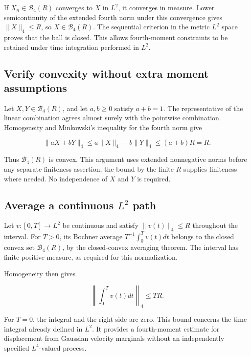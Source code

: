 \documentclass[11pt,a4paper]{report}
\begin{document}
If \(X_n\in\mathcal B_4(R)\) converges to \(X\) in \(L^2\), it converges in measure. Lower semicontinuity of the extended fourth norm under this convergence gives \(\|X\|_4\le R\), so \(X\in\mathcal B_4(R)\). The sequential criterion in the metric \(L^2\) space proves that the ball is closed. This allows fourth-moment constraints to be retained under time integration performed in \(L^2\).

\subsection{\texorpdfstring{Verify convexity without extra moment assumptions}{Verify convexity without extra moment assumptions}}
\label{report-step-KineticLangevin-LpMomentIntegral-lean-2}


Let \(X,Y\in\mathcal B_4(R)\), and let \(a,b\ge0\) satisfy \(a+b=1\). The representative of the linear combination agrees almost surely with the pointwise combination. Homogeneity and Minkowski's inequality for the fourth norm give

\[\|aX+bY\|_4\le a\|X\|_4+b\|Y\|_4\le(a+b)R=R.\]

Thus \(\mathcal B_4(R)\) is convex. This argument uses extended nonnegative norms before any separate finiteness assertion; the bound by the finite \(R\) supplies finiteness where needed. No independence of \(X\) and \(Y\) is required.

\subsection{\texorpdfstring{Average a continuous \(L^{2}\) path}{Average a continuous L² path}}
\label{report-step-KineticLangevin-LpMomentIntegral-lean-3}


Let \(v:[0,T]\to L^2\) be continuous and satisfy \(\|v(t)\|_4\le R\) throughout the interval. For \(T>0\), its Bochner average \(T^{-1}\int_0^Tv(t)dt\) belongs to the closed convex set \(\mathcal B_4(R)\), by the closed-convex averaging theorem. The interval has finite positive measure, as required for this normalization.



Homogeneity then gives

\[\left\|\int_0^Tv(t)dt\right\|_4\le TR.\]

For \(T=0\), the integral and the right side are zero. This bound concerns the time integral already defined in \(L^2\). It provides a fourth-moment estimate for displacement from Gaussian velocity marginals without an independently specified \(L^4\)-valued process.
\end{document}
